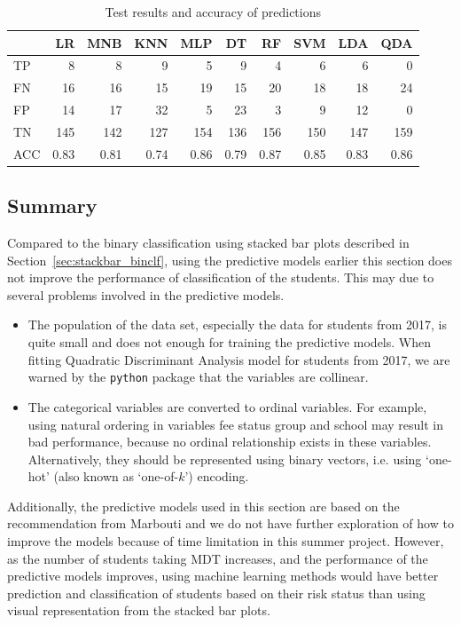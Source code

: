 \documentclass[a4paper]{report}
\begin{document}
\begin{table}[H]
  \centering
  \begin{tabular}{lrrrrrrrrr}
    \toprule
    {} &   LR &  MNB &  KNN &  MLP &   DT &   RF &  SVM &  LDA &  QDA \\
    \midrule
    TP  &    8 &    8 &    9 &    5 &    9 &    4 &    6 &    6 &    0 \\
    FN  &   16 &   16 &   15 &   19 &   15 &   20 &   18 &   18 &   24 \\
    FP  &   14 &   17 &   32 &    5 &   23 &    3 &    9 &   12 &    0 \\
    TN  &  145 &  142 &  127 &  154 &  136 &  156 &  150 &  147 &  159 \\
    ACC & 0.83 & 0.81 & 0.74 & 0.86 & 0.79 & 0.87 & 0.85 & 0.83 & 0.86 \\
    \bottomrule
  \end{tabular}
  \caption{\label{tab:ML_Y1Fs_bin_Qual_17}Test results and accuracy of predictions}
\end{table}

\subsection{Summary}

Compared to the binary classification using stacked bar plots described in Section~\ref{sec:stackbar_binclf}, using the predictive models earlier this section does not improve the performance of classification of the students. This may due to several problems involved in the predictive models. 

\begin{itemize}
\item The population of the data set, especially the data for students from 2017, is quite small and does not enough for training the predictive models. When fitting Quadratic Discriminant Analysis model for students from 2017, we are warned by the \texttt{python} package that the variables are collinear. 
\item The categorical variables are converted to ordinal variables. For example, using natural ordering in variables fee status group and school may result in bad performance, because no ordinal relationship exists in these variables. Alternatively, they should be represented using binary vectors, i.e. using `one-hot' (also known as `one-of-$k$') encoding. 
\end{itemize}

Additionally, the predictive models used in this section are based on the recommendation from Marbouti \cite{ml} and we do not have further exploration of how to improve the models because of time limitation in this summer project. However, as the number of students taking MDT increases, and the performance of the predictive models improves, using machine learning methods would have better prediction and classification of students based on their risk status than using visual representation from the stacked bar plots. 


\nocite{*} %
\newpage
{}
\printbibliography
\end{document}
